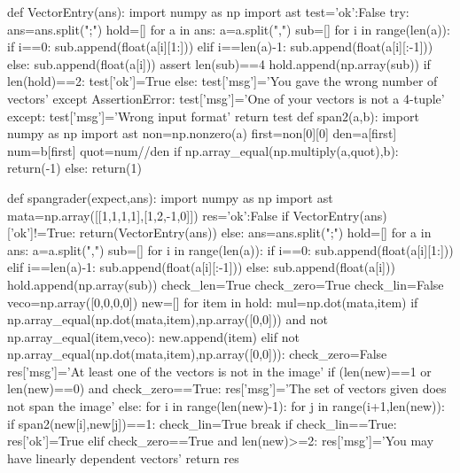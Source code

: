 
\begin{edXscript}

def VectorEntry(ans):
    import numpy as np
    import ast
    test={'ok':False}
    try:
        ans=ans.split(";")
        hold=[]
        for a in ans:
            a=a.split(",")
            sub=[]
            for i in range(len(a)):
                if i==0:
                    sub.append(float(a[i][1:]))
                elif i==len(a)-1:
                    sub.append(float(a[i][:-1]))
                else:
                    sub.append(float(a[i]))
            assert len(sub)==4
            hold.append(np.array(sub))
        if len(hold)==2:
            test['ok']=True
        else:
            test['msg']='You gave the wrong number of vectors'        
    except AssertionError:
        test['msg']='One of your vectors is not a 4-tuple'
    except:
        test['msg']='Wrong input format'
    return test  
def span2(a,b):
    import numpy as np
    import ast
    non=np.nonzero(a)
    first=non[0][0]
    den=a[first]
    num=b[first]
    quot=num//den
    if np.array_equal(np.multiply(a,quot),b):
        return(-1)
    else:
        return(1)
        
def spangrader(expect,ans):
    import numpy as np
    import ast
    mata=np.array([[1,1,1,1],[1,2,-1,0]])
    res={'ok':False}
    if VectorEntry(ans)['ok']!=True:
        return(VectorEntry(ans))
    else:
        ans=ans.split(";")
        hold=[]
        for a in ans:
            a=a.split(",")
            sub=[]
            for i in range(len(a)):
                if i==0:
                    sub.append(float(a[i][1:]))
                elif i==len(a)-1:
                    sub.append(float(a[i][:-1]))
                else:
                    sub.append(float(a[i]))
            hold.append(np.array(sub))
        check_len=True
        check_zero=True
        check_lin=False
        veco=np.array([0,0,0,0])
        new=[]
        for item in hold:
            mul=np.dot(mata,item)
            if np.array_equal(np.dot(mata,item),np.array([0,0])) and not np.array_equal(item,veco):
                new.append(item)
            elif not np.array_equal(np.dot(mata,item),np.array([0,0])):
                check_zero=False
                res['msg']='At least one of the vectors is not in the image'
        if (len(new)==1 or len(new)==0) and check_zero==True:
            res['msg']='The set of vectors given does not span the image'
        else:
            for i in range(len(new)-1):
                for j in range(i+1,len(new)):
                    if span2(new[i],new[j])==1:
                        check_lin=True
                        break
            if check_lin==True:
                res['ok']=True
            elif check_zero==True and len(new)>=2:
                res['msg']='You may have linearly dependent vectors'
        return res

\end{edXscript}
